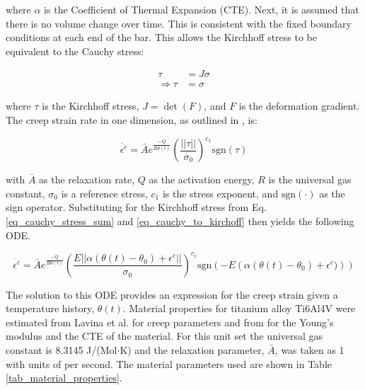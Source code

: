 \documentclass[conf]{new-aiaa}
\begin{document}
\noindent
where $\alpha$ is the Coefficient of Thermal Expansion (CTE).
Next, it is assumed that there is no volume change over time.
This is consistent with the fixed boundary conditions at 
each end of the bar.
This allows the Kirchhoff stress to be equivalent to the Cauchy stress:

\begin{align}
\tau &= J \sigma \\
\Rightarrow
  \tau &= \sigma \label{eq_cauchy_to_kirchoff}
\end{align}

\noindent
where $\tau$ is the Kirchhoff stress,
$J=\det(F)$,
and $F$ is the deformation gradient.
The creep strain rate in one dimension, as outlined in 
\cite{ li_simulation_of_finite_strain_inelastic_phenomena_governed_by_creep_and_plasticity},
is:

\begin{equation}
\dot{\epsilon^c} = \bar{A} e^{\frac{-Q}{R \theta(t)}} \left( \frac{ ||\tau||}{\sigma_0} \right)^{c_1} \text{sgn}(\tau)
\end{equation}

\noindent
with $\bar{A}$ as the relaxation rate,
$Q$ as the activation energy,
$R$ is the universal gas constant,
$\sigma_0$ is a reference stress,
$c_1$ is the stress exponent,
and
$\text{sgn}(\cdot)$ as the sign operator.
Substituting for the Kirchhoff stress from Eq. \ref{eq_cauchy_stress_sum} and \ref{eq_cauchy_to_kirchoff}
then yields the following ODE.

\begin{equation} \label{eq_creep_ode}
\dot{\epsilon^c} = \bar{A} e^{\frac{-Q}{R \theta(t)}} 
    \left( \frac{E || \alpha (\theta(t) - \theta_0) + \epsilon^c||}{\sigma_0} \right)^{c_1} 
    \text{sgn}\left( -E \left( \alpha (\theta(t) - \theta_0) + \epsilon^c) \right) \right)
\end{equation}

The solution to this ODE provides an expression for the creep strain
given a temperature history, $\theta(t)$.
Material properties for titanium alloy Ti6Al4V were estimated from
Lavina et al. \cite{ lavina_creep_behavior_of_Ti6Al4V_from_450C_to_600C}
for creep parameters and from \cite{
boyer_materials_properties_handbook_titanium_alloys}
for the Young's modulus and the CTE of the material.
For this unit set the universal gas constant is 8.3145 J/(Mol$\cdot$K)
and the relaxation parameter, $\bar{A}$, was taken as 1 with units of per second.
The material parameters used are shown in Table \ref{tab_material_properties}.
\end{document}
